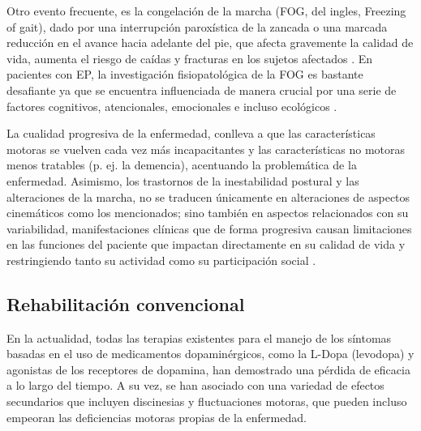 Otro evento frecuente, es la congelación de la marcha (FOG, del ingles, Freezing of gait), dado por una interrupción paroxística de la zancada o una marcada reducción en el avance hacia adelante del pie, que afecta gravemente la calidad de vida, aumenta el riesgo de caídas y fracturas en los sujetos afectados \cite{Perez-Lloret2014,Bloem2004}. En pacientes con EP, la investigación fisiopatológica de la FOG es bastante desafiante ya que se encuentra influenciada de manera crucial por una serie de factores cognitivos, atencionales, emocionales e incluso ecológicos \cite{Professor2008,Barthel2016}.

La cualidad progresiva de la enfermedad, conlleva a que las características motoras se vuelven cada vez más incapacitantes y las características no motoras menos tratables (p. ej. la demencia), acentuando la problemática de la enfermedad. Asimismo, los trastornos de la inestabilidad postural y las alteraciones de la marcha, no se traducen únicamente en alteraciones de aspectos cinemáticos como los mencionados; sino también en aspectos relacionados con su variabilidad, manifestaciones clínicas que de forma progresiva causan limitaciones en las funciones del paciente que impactan directamente en su calidad de vida y restringiendo tanto su actividad como su participación social \cite{DILLMANN2014882,MUNOZHELLIN2013190,FernandezDelOlmo2004,GOMEZGONZALEZ2019396}.

\subsection{Rehabilitación convencional}

En la actualidad, todas las terapias existentes para el manejo de los síntomas basadas en el uso de medicamentos dopaminérgicos, como la L-Dopa (levodopa) y agonistas de los receptores de \gls{dopamina}, han demostrado una pérdida de eficacia a lo largo del tiempo. A su vez, se han asociado con una variedad de efectos secundarios que incluyen \gls{discinesias} y fluctuaciones motoras, que pueden incluso empeoran las deficiencias motoras propias de la enfermedad.

